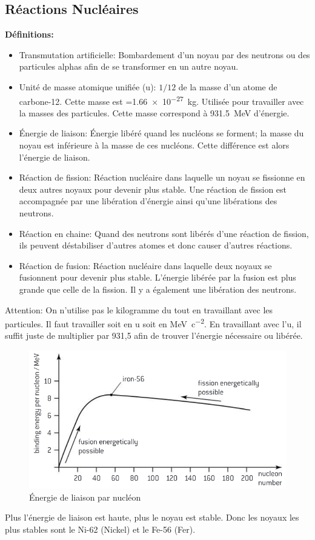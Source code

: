 \documentclass[french, a4paper, 12pt]{article}
\begin{document}
\subsection{Réactions Nucléaires}
\textbf{Définitions:}
\begin{itemize}
\item Transmutation artificielle: Bombardement d'un noyau par des neutrons ou des particules alphas afin de se transformer en un autre noyau.
\item Unité de masse atomique unifiée (u): $1/12$ de la masse d'un atome de carbone-12. Cette masse est =\SI{1.66e-27}{kg}. Utilisée pour travailler avec la masses des particules. Cette masse correspond à \SI{931.5}{MeV} d'énergie.
\item Énergie de liaison: Énergie libéré quand les nucléons se forment; la masse du noyau est inférieure à la masse de ces nucléons. Cette différence est alors l'énergie de liaison.
\item Réaction de fission: Réaction nucléaire dans laquelle un noyau se fissionne en deux autres noyaux pour devenir plus stable. Une réaction de fission est accompagnée par une libération d'énergie ainsi qu'une libérations des neutrons.
\item Réaction en chaine: Quand des neutrons sont libérés d'une réaction de fission, ils peuvent déstabiliser d'autres atomes et donc causer d'autres réactions.
\item Réaction de fusion: Réaction nucléaire dans laquelle deux noyaux se fusionnent pour devenir plus stable. L'énergie libérée par la fusion est plus grande que celle de la fission. Il y a également une libération des neutrons.
\end{itemize}
Attention: On n'utilise pas le kilogramme du tout en travaillant avec les particules. Il faut travailler soit en u soit en \si{MeV.c^{-2}}. En travaillant avec l'u, il suffit juste de multiplier par 931,5 afin de trouver l'énergie nécessaire ou libérée.
\begin{figure}[H]
\centering
\includegraphics[scale=0.6]{binding_energy_curve}
\caption{Énergie de liaison par nucléon}
\end{figure}
Plus l'énergie de liaison est haute, plus le noyau est stable. Donc les noyaux les plus stables sont le Ni-62 (Nickel) et le Fe-56 (Fer).
\end{document}
